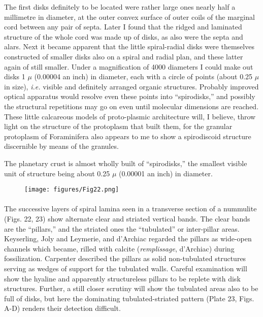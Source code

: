 \documentclass[a4paper, 12pt, oneside]{article}
\begin{document}
The first disks definitely to be located were rather large ones nearly half a millimetre in diameter, at the outer convex surface of outer coils of the marginal cord between any pair of septa. Later I found that the ridged and laminated structure of the whole cord was made up of disks, as also were the septa and alars. Next it became apparent that the little spiral-radial disks were themselves constructed of smaller disks also on a spiral and radial plan, and these latter again of still smaller. Under a magnification of 4000 diameters I could make out disks 1 $\mu$ (0.00004 an inch) in diameter, each with a circle of points (about 0.25 $\mu$ in size), \emph{i.e.} visible and definitely arranged organic structures. Probably improved optical apparatus would resolve even these points into ``spirodisks,'' and possibly the structural repetitions may go on even until molecular dimensions are reached. These little calcareous models of proto-plasmic architecture will, I believe, throw light on the structure of the protoplasm that built them, for the granular protoplasm of Foraminifera also appears to me to show a spirodiscoid structure discernible by means of the granules.

The planetary crust is almost wholly built of ``spirodisks,'' the smallest visible unit of structure being about 0.25 $\mu$ (0.00001 an inch) in diameter.
\begin{figure}[H]
\centering
\texttt{[image: figures/Fig22.png]}
\caption*{}
\end{figure}
\paragraph{}
The successive layers of spiral lamina seen in a transverse section of a nummulite (Figs. 22, 23) show alternate clear and striated vertical bands. The clear bands are the ``pillars,'' and the striated ones the ``tubulated'' or inter-pillar areas. Keyserling, Joly and Leymerie, and d'Archiac regarded the pillars as wide-open channels which became, rilled with calcite (\emph{remplissage}, d'Archiac) during fossilization. Carpenter described the pillars as solid non-tubulated structures serving as wedges of support for the tubulated walls. Careful examination will show the hyaline and apparently structureless pillars to be replete with disk structures. Further, a still closer scrutiny will show the tubulated areas also to be full of disks, but here the dominating tubulated-striated pattern (Plate 23, Figs. A-D) renders their detection difficult.
\end{document}

